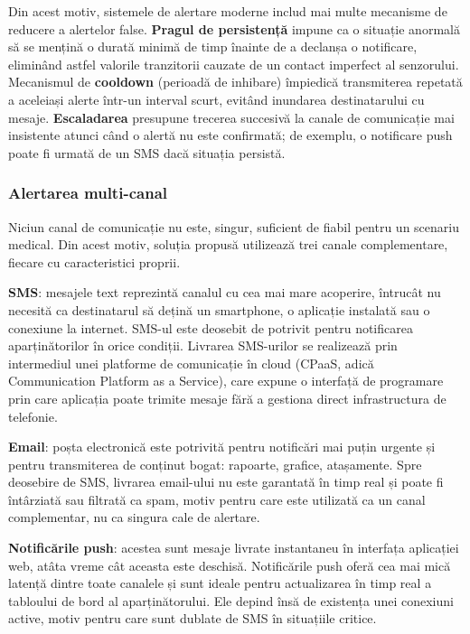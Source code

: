 \documentclass[12pt,a4paper]{article}
\begin{document}
Din acest motiv, sistemele de alertare moderne includ mai multe mecanisme de reducere a alertelor false. \textbf{Pragul de persistență} impune ca o situație anormală să se mențină o durată minimă de timp înainte de a declanșa o notificare, eliminând astfel valorile tranzitorii cauzate de un contact imperfect al senzorului. Mecanismul de \textbf{cooldown} (perioadă de inhibare) împiedică transmiterea repetată a aceleiași alerte într-un interval scurt, evitând inundarea destinatarului cu mesaje. \textbf{Escaladarea} presupune trecerea succesivă la canale de comunicație mai insistente atunci când o alertă nu este confirmată; de exemplu, o notificare push poate fi urmată de un SMS dacă situația persistă.

\subsubsection{Alertarea multi-canal}

Niciun canal de comunicație nu este, singur, suficient de fiabil pentru un scenariu medical. Din acest motiv, soluția propusă utilizează trei canale complementare, fiecare cu caracteristici proprii.

\textbf{SMS}: mesajele text reprezintă canalul cu cea mai mare acoperire, întrucât nu necesită ca destinatarul să dețină un smartphone, o aplicație instalată sau o conexiune la internet. SMS-ul este deosebit de potrivit pentru notificarea aparținătorilor în orice condiții. Livrarea SMS-urilor se realizează prin intermediul unei platforme de comunicație în cloud (CPaaS, adică Communication Platform as a Service), care expune o interfață de programare prin care aplicația poate trimite mesaje fără a gestiona direct infrastructura de telefonie.

\textbf{Email}: poșta electronică este potrivită pentru notificări mai puțin urgente și pentru transmiterea de conținut bogat: rapoarte, grafice, atașamente. Spre deosebire de SMS, livrarea email-ului nu este garantată în timp real și poate fi întârziată sau filtrată ca spam, motiv pentru care este utilizată ca un canal complementar, nu ca singura cale de alertare.

\textbf{Notificările push}: acestea sunt mesaje livrate instantaneu în interfața aplicației web, atâta vreme cât aceasta este deschisă. Notificările push oferă cea mai mică latență dintre toate canalele și sunt ideale pentru actualizarea în timp real a tabloului de bord al aparținătorului. Ele depind însă de existența unei conexiuni active, motiv pentru care sunt dublate de SMS în situațiile critice.
\end{document}
